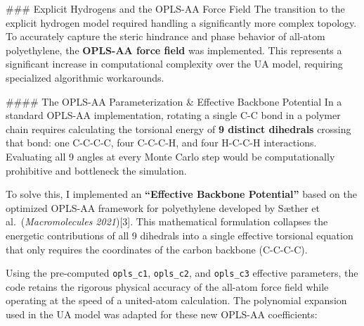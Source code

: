 \documentclass[
]{article}
\begin{document}
\#\#\# Explicit Hydrogens and the OPLS-AA Force Field The transition to
the explicit hydrogen model required handling a significantly more
complex topology. To accurately capture the steric hindrance and phase
behavior of all-atom polyethylene, the \textbf{OPLS-AA force field} was
implemented. This represents a significant increase in computational
complexity over the UA model, requiring specialized algorithmic
workarounds.

\#\#\#\# The OPLS-AA Parameterization \& Effective Backbone Potential In
a standard OPLS-AA implementation, rotating a single C-C bond in a
polymer chain requires calculating the torsional energy of \textbf{9
distinct dihedrals} crossing that bond: one C-C-C-C, four C-C-C-H, and
four H-C-C-H interactions. Evaluating all 9 angles at every Monte Carlo
step would be computationally prohibitive and bottleneck the simulation.

To solve this, I implemented an \textbf{``Effective Backbone
Potential''} based on the optimized OPLS-AA framework for polyethylene
developed by Sæther et al.~(\emph{Macromolecules 2021}){[}3{]}. This
mathematical formulation collapses the energetic contributions of all 9
dihedrals into a single effective torsional equation that only requires
the coordinates of the carbon backbone (C-C-C-C).

Using the pre-computed \texttt{opls\_c1}, \texttt{opls\_c2}, and
\texttt{opls\_c3} effective parameters, the code retains the rigorous
physical accuracy of the all-atom force field while operating at the
speed of a united-atom calculation. The polynomial expansion used in the
UA model was adapted for these new OPLS-AA coefficients:
\end{document}
